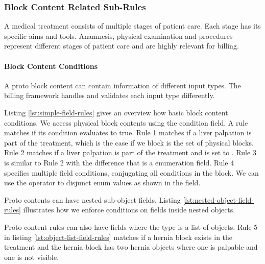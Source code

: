 \subsubsection{Block Content Related Sub-Rules}
A medical treatment consists of multiple stages of patient care.
Each stage has its specific aims and tools.
Anamnesis,
physical examination and procedures represent different stages of patient care and are highly relevant for billing.

\paragraph{Block Content Conditions}\label{par:block-content-field-types}
A proto block content can contain information of different input types.
The billing framework handles and validates each input type differently.



Listing \ref{lst:simple-field-rules} gives an overview how basic block content conditions.
We access physical block contents using the  condition field.
A rule matches if its condition evaluates to true.
Rule 1 matches if a liver palpation is part of the treatment, which is the case if we  block is the set of physical blocks.
Rule 2 matches if a liver palpation is part of the treatment and  is set to \true.
Rule 3 is similar to Rule 2 with the difference that  is a enumeration field.
Rule 4 specifies multiple field conditions, conjugating all conditions in the block.
We can use the \code{|} operator to disjunct enum values as shown in the  field.

Proto contents can have nested sub-object fields.
Listing \ref{lst:nested-object-field-rules} illustrates how we enforce conditions on fields inside nested objects.


Proto content rules can also have fields where the type is a list of objects.
Rule 5 in listing \ref{lst:object-list-field-rules} matches if a hernia block exists in the treatment and the hernia block has two hernia objects where one is palpable and one is not visible.


